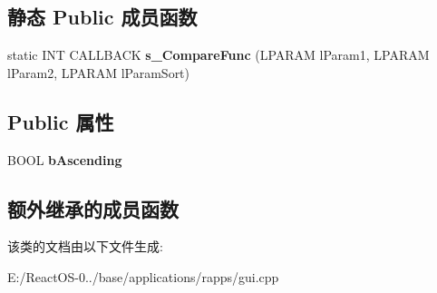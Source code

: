 \subsection*{静态 Public 成员函数}
\begin{DoxyCompactItemize}
\item 
\mbox{\label{class_c_apps_list_view_af1422f30cb01baff30ab54bec8579946}} 
static I\+NT C\+A\+L\+L\+B\+A\+CK {\bfseries s\+\_\+\+Compare\+Func} (L\+P\+A\+R\+AM l\+Param1, L\+P\+A\+R\+AM l\+Param2, L\+P\+A\+R\+AM l\+Param\+Sort)
\end{DoxyCompactItemize}
\subsection*{Public 属性}
\begin{DoxyCompactItemize}
\item 
\mbox{\label{class_c_apps_list_view_ac7b9634fbd7f18f003623e35038b1efb}} 
B\+O\+OL {\bfseries b\+Ascending}
\end{DoxyCompactItemize}
\subsection*{额外继承的成员函数}


该类的文档由以下文件生成\+:\begin{DoxyCompactItemize}
\item 
E\+:/\+React\+O\+S-\/0../base/applications/rapps/gui.\+cpp\end{DoxyCompactItemize}

